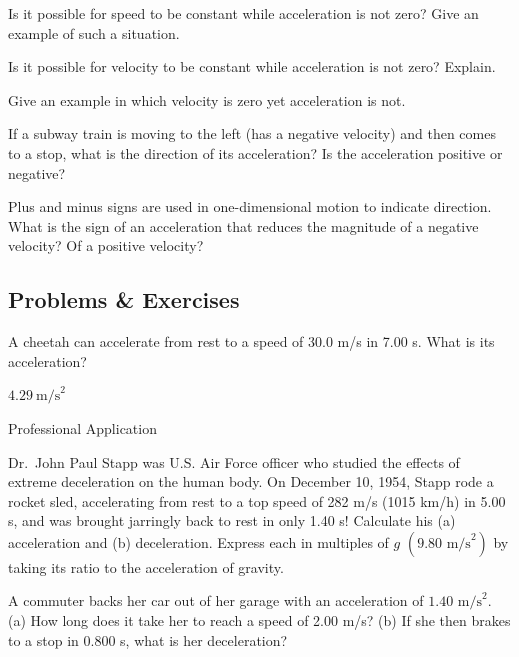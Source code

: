 \documentclass[
]{book}
\begin{document}
\hypertarget{fs-id3526394}{}
\leavevmode{}%
Is it possible for speed to be constant while acceleration is not zero?
Give an example of such a situation.

\hypertarget{fs-id4016173}{}
\leavevmode{}%
Is it possible for velocity to be constant while acceleration is not
zero? Explain.

\hypertarget{fs-id3514238}{}
\leavevmode{}%
Give an example in which velocity is zero yet acceleration is not.

\hypertarget{fs-id1765962}{}
\leavevmode{}%
If a subway train is moving to the left (has a negative velocity) and
then comes to a stop, what is the direction of its acceleration? Is the
acceleration positive or negative?

\hypertarget{fs-id1780345}{}
\leavevmode{}%
Plus and minus signs are used in one-dimensional motion to indicate
direction. What is the sign of an acceleration that reduces the
magnitude of a negative velocity? Of a positive velocity?

\hypertarget{fs-id4129894}{}
\hypertarget{problems-exercises-2}{%
\subsection{Problems \& Exercises}\label{problems-exercises-2}}

\hypertarget{fs-id4129901}{}
\leavevmode{}%
A cheetah can accelerate from rest to a speed of 30.0 m/s in 7.00 s.
What is its acceleration?

\leavevmode{}%
\({4\text{.}\text{29}\ \text{m/s}^{2}}{}\)

\hypertarget{fs-id4035192}{}
\hypertarget{fs-id4035194}{}
{Professional Application}

Dr.~John Paul Stapp was U.S. Air Force officer who studied the effects
of extreme deceleration on the human body. On December 10, 1954, Stapp
rode a rocket sled, accelerating from rest to a top speed of 282 m/s
(1015 km/h) in 5.00 s, and was brought jarringly back to rest in only
1.40 s! Calculate his (a) acceleration and (b) deceleration. Express
each in multiples of \(g{}\) \({(9\text{.}\text{80\ m}\text{/s}^{2})}{}\) by
taking its ratio to the acceleration of gravity.

\hypertarget{fs-id2299988}{}
\leavevmode{}%
A commuter backs her car out of her garage with an acceleration of
\({1\text{.}\text{40\ m/s}^{2}}{}\). (a) How long does it take her to
reach a speed of 2.00 m/s? (b) If she then brakes to a stop in 0.800 s,
what is her deceleration?
\end{document}
